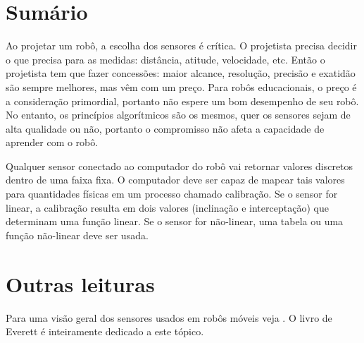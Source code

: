 \section{Sumário}

Ao projetar um robô, a escolha dos sensores é crítica. O projetista precisa decidir o que precisa para as medidas: distância, atitude, velocidade, etc. Então o projetista tem que fazer concessões: maior alcance, resolução, precisão e exatidão são sempre melhores, mas vêm com um preço. Para robôs educacionais, o preço é a consideração primordial, portanto não espere um bom desempenho de seu robô. No entanto, os princípios algorítmicos são os mesmos, quer os sensores sejam de alta qualidade ou não, portanto o compromisso não afeta a capacidade de aprender com o robô.

Qualquer sensor conectado ao computador do robô vai retornar valores discretos dentro de uma faixa fixa. O computador deve ser capaz de mapear tais valores para quantidades físicas em um processo chamado calibração. Se o sensor for linear, a calibração resulta em dois valores (inclinação e interceptação) que determinam uma função linear. Se o sensor for não-linear, uma tabela ou uma função não-linear deve ser usada.


\section{Outras leituras}

Para uma visão geral dos sensores usados em robôs móveis veja \cite[seção 4.1]{siegwart}. O livro de Everett \cite{everett} é inteiramente dedicado a este tópico.
